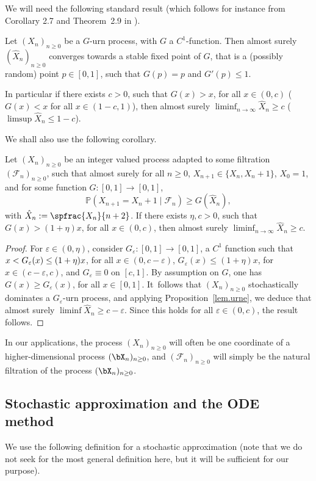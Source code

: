 We will need the following standard result (which follows for instance from Corollary 2.7 and Theorem~2.9 in \cite{Pemantle}).
\begin{proposition}\label{lem.urne}
Let $(X_n)_{n\ge 0}$ be a $G$-urn process, with $G$ a $C^1$-function. Then almost surely $(\hat X_n)_{n\ge 0}$ converges towards a stable fixed point
of $G$, that is a (possibly random) point $p\in [0,1]$, such that $G(p)= p$ and $G'(p)\le 1$.

In particular if there exists $c>0$, such that $G(x)>x$, for all $x\in (0,c)$ (\resp $G(x)<x$ for all $x\in (1-c,1)$),
then almost surely $\liminf_{n\to \infty} {\hat X_n}\ge c$ (\resp $\limsup {\hat X_n} \le 1-c$).
\end{proposition}
We shall also use the following corollary.
\begin{corollary}\label{prop.urne}
Let $(X_n)_{n\ge 0}$ be an integer valued process adapted to some filtration $(\mathcal F_n)_{n\ge 0}$, such that almost surely for all $n\ge 0$, $X_{n+1} \in \{X_n,X_n+1\}$, $X_0=1$, and for some function $G:[0,1]\to [0,1]$,
\begin{equation}\label{Gurn.dom}
\mathbb P(X_{n+1} = X_n +1 \mid \mathcal F_n) \ge G(\hat X_n),
\end{equation}
with $\hat X_n :=\spfrac{X_n}{n+2}$.
If there exists $\eta, c>0$, such that $G(x) > (1+\eta)x$, for all $x\in (0,c)$,
then almost surely $\liminf_{n\to \infty} {\hat X_n} \ge c$.
\end{corollary}
\begin{proof} For $\varepsilon \in (0,\eta)$, consider $G_\varepsilon:[0,1] \to [0,1]$, a $C^1$ function such that
$x <\nobreak G_\varepsilon(x) \le (1+\eta)x$, for all $x\in (0,c-\varepsilon)$, $G_\varepsilon(x) \le (1+\eta)x$, for $x\in (c-\varepsilon,c)$, and $G_\varepsilon \equiv 0$ on $[c,1]$. By assumption on $G$,
one has $G(x) \ge G_\varepsilon(x)$, for all $x\in [0,1]$. It~follows that $(X_n)_{n\ge 0}$ stochastically dominates a $G_\varepsilon$-urn process, and
applying {Proposition}~\ref{lem.urne}, we deduce that almost surely $\liminf \hat X_n \ge c-\varepsilon$.
Since this holds for all $\varepsilon \in (0,c)$, the result follows.
\end{proof}
In our applications, the process $(X_n)_{n\ge 0}$ will often be one coordinate of a higher-dimensional process $(\bX_n)_{n\ge 0}$, and
$(\mathcal F_n)_{n\ge 0}$ will simply be the natural filtration of the process $(\bX_n)_{n\ge 0}$.

\subsection{Stochastic approximation and the ODE method}\label{sec.stoch.approx}
We use the following definition for a stochastic approximation (note that we do not seek for the most general definition here, but it will be sufficient for our purpose).

